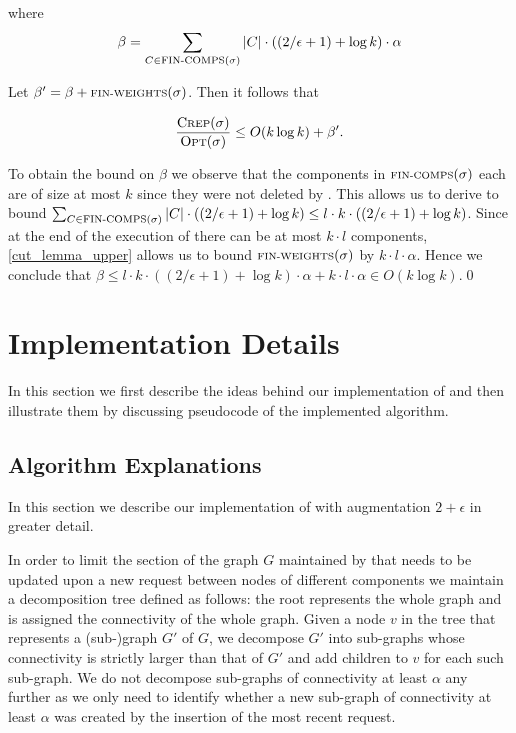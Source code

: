 \documentclass[a4paper,xcolor=dvipsnames, tikz, 12pt]{article}
\newcommand{\crep}{\text{C{\scriptsize REP}}}
\newcommand{\opt}{\text{O{\scriptsize PT}}}
\newcommand{\finalComps}{\text{\scriptsize FIN-COMPS}}
\newcommand{\finalWeights}{\text{\scriptsize FIN-WEIGHTS}}
\theoremstyle{definition}
\begin{document}
\noindent where
\begin{align*}
	\beta=\sum_{C\in \finalComps(\sigma)}|C|\cdot((2/\epsilon+1)+\log k)\cdot\alpha
\end{align*}

\noindent Let $\beta'=\beta+\finalWeights(\sigma)$. Then it follows that

\begin{align*}
\frac{\crep{}(\sigma)}{\opt(\sigma)}\leq O(k \log k) +\beta'.
\end{align*}

To obtain the bound on $\beta$ we observe that the components in $\finalComps(\sigma)$ each are of size at most $k$ since they were not deleted by \crep{}. This allows us to derive to bound $\sum_{C\in \finalComps(\sigma)}|C|\cdot((2/\epsilon+1)+\log k)\leq l \cdot k \cdot ((2/\epsilon+1)+\log k)$. Since at the end of the execution of \crep{} there can be at most $k\cdot l$ components, \cref{cut_lemma_upper} allows us to bound $\finalWeights(\sigma)$ by $k\cdot l \cdot\alpha$. Hence we conclude that $\beta\leq l\cdot k \cdot
((2/\epsilon+1)+\log k)\cdot\alpha+k\cdot l\cdot \alpha\in O(k \log k)$.\qed


\section{Implementation Details}
\label{implDetSection}
In this section we first describe the ideas behind our implementation of \crep{} and then illustrate them by discussing pseudocode of the implemented algorithm.

\subsection{Algorithm Explanations}

In this section we describe our implementation of \crep{} with augmentation $2+\epsilon$ in greater detail.

In order to limit the section of the graph $G$ maintained by \crep{} that needs to be updated upon a new request between nodes of different components we maintain a decomposition tree defined as follows: the root represents the whole graph and is assigned the connectivity of the whole graph. Given a node $v$ in the tree that represents a (sub-)graph $G'$ of $G$, we decompose $G'$ into sub-graphs whose connectivity is strictly larger than that of $G'$ and add children to $v$ for each such sub-graph. We do not decompose sub-graphs of connectivity at least $\alpha$ any further as we only need to identify whether a new sub-graph of connectivity at least $\alpha$ was created by the insertion of the most recent request.
\end{document}
